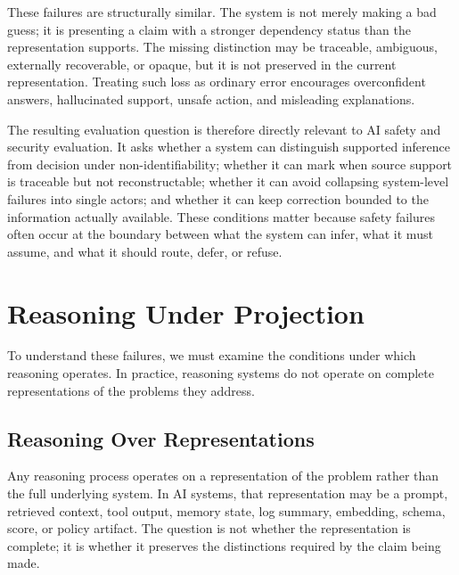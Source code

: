 \documentclass[11pt]{article}
\begin{document}
These failures are structurally similar. The system is not merely making a bad guess; it is presenting a claim with a stronger dependency status than the representation supports. The missing distinction may be traceable, ambiguous, externally recoverable, or opaque, but it is not preserved in the current representation. Treating such loss as ordinary error encourages overconfident answers, hallucinated support, unsafe action, and misleading explanations.

The resulting evaluation question is therefore directly relevant to AI safety and security evaluation. It asks whether a system can distinguish supported inference from decision under non-identifiability; whether it can mark when source support is traceable but not reconstructable; whether it can avoid collapsing system-level failures into single actors; and whether it can keep correction bounded to the information actually available. These conditions matter because safety failures often occur at the boundary between what the system can infer, what it must assume, and what it should route, defer, or refuse.

\section{Reasoning Under Projection}

To understand these failures, we must examine the conditions under which reasoning operates. In practice, reasoning systems do not operate on complete representations of the problems they address.

\subsection{Reasoning Over Representations}

Any reasoning process operates on a representation of the problem rather than the full underlying system. In AI systems, that representation may be a prompt, retrieved context, tool output, memory state, log summary, embedding, schema, score, or policy artifact. The question is not whether the representation is complete; it is whether it preserves the distinctions required by the claim being made.
\end{document}
